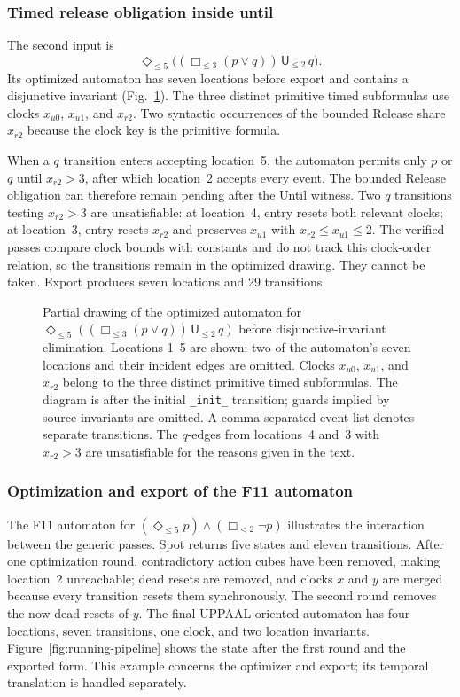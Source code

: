 \subsubsection{Timed release obligation inside until}
The second input is
\[
  \Diamond_{\le5}\bigl((\Box_{\le3}(p\lor q))\,\mathsf U_{\le2}\,q\bigr).
\]
Its optimized automaton has seven locations before export and contains a
disjunctive invariant (Fig.~\ref{fig:ex2-disj}). The three distinct primitive
timed subformulas use clocks $x_{u0}$, $x_{u1}$, and $x_{r2}$. Two syntactic
occurrences of the bounded Release share $x_{r2}$ because the clock key is
the primitive formula.

When a $q$ transition enters accepting location~5, the automaton permits only
$p$ or $q$ until $x_{r2}>3$, after which location~2 accepts every event. The
bounded Release obligation can therefore remain pending after the Until
witness. Two $q$ transitions testing $x_{r2}>3$ are unsatisfiable: at
location~4, entry resets both relevant clocks; at location~3, entry resets
$x_{r2}$ and preserves $x_{u1}$ with $x_{r2}\le x_{u1}\le2$. The verified
passes compare clock bounds with constants and do not track this clock-order
relation, so the transitions remain in the optimized drawing. They cannot be
taken. Export produces seven locations and 29 transitions.

\begin{figure}[!t]
\centering
\resizebox{\textwidth}{!}{}
\caption{Partial drawing of the optimized automaton for
$\Diamond_{\le5}((\Box_{\le3}(p\lor q))\,\mathsf U_{\le2}\,q)$ before
disjunctive-invariant elimination. Locations 1--5 are shown; two of the
automaton's seven locations and their incident edges are omitted. Clocks
$x_{u0}$, $x_{u1}$, and $x_{r2}$
belong to the three distinct primitive timed subformulas. The diagram is
after the initial \texttt{\_init\_} transition; guards implied by source
invariants are omitted. A comma-separated event list denotes separate
transitions. The $q$-edges from locations~4 and~3 with $x_{r2}>3$ are
unsatisfiable for the reasons given in the text.}
\label{fig:ex2-disj}
\end{figure}

\subsubsection{Optimization and export of the F11 automaton}
The F11 automaton for
$ (\Diamond_{\le5}p)\land(\Box_{<2}\neg p) $ illustrates the interaction
between the generic passes. Spot returns five states and eleven transitions.
After one optimization round, contradictory action cubes have been removed,
making location~2 unreachable; dead resets are removed, and clocks $x$ and
$y$ are merged because every transition resets them synchronously. The
second round removes the now-dead resets of $y$. The final UPPAAL-oriented
automaton has four locations, seven transitions, one clock, and two location
invariants. Figure~\ref{fig:running-pipeline} shows the state after the first
round and the exported form. This example concerns the optimizer and export;
its temporal translation is handled separately.

